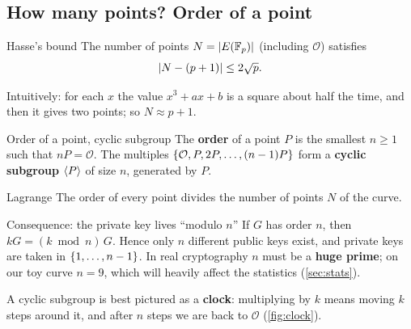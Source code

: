 \subsection{How many points? Order of a point}

\begin{framedthm}[label={thm:hasse}]{Hasse's bound}
  The number of points $N = \left\lvert E(\mathbb{F}_p)\right\rvert$ (including $\mathcal{O}$) satisfies
  \[
    \left\lvert N - (p+1)\right\rvert \le 2\sqrt{p}.
  \]
\end{framedthm}

Intuitively: for each $x$ the value $x^3 + ax + b$ is a square about half the time, and then it gives two points; so $N \approx p + 1$.

\begin{frameddefn}[label={def:order}]{Order of a point, cyclic subgroup}
  The \textbf{order} of a point $P$ is the smallest $n \ge 1$ such that $nP = \mathcal{O}$. The multiples $\left\{\mathcal{O}, P, 2P, \ldots, (n-1)P\right\}$ form a \textbf{cyclic subgroup} $\left\langle P \right\rangle$ of size $n$, generated by $P$.
\end{frameddefn}

\begin{framedthm}[label={thm:lagrange}]{Lagrange}
  The order of every point divides the number of points $N$ of the curve.
\end{framedthm}

\begin{framedobs}{Consequence: the private key lives ``modulo $n$''}
  If $G$ has order $n$, then $kG = (k \bmod n)\, G$. Hence only $n$ different public keys exist, and private keys are taken in $\left\{1, \ldots, n-1\right\}$. In real cryptography $n$ must be a \textbf{huge prime}; on our toy curve $n = 9$, which will heavily affect the statistics (\cref{sec:stats}).
\end{framedobs}

A cyclic subgroup is best pictured as a \textbf{clock}: multiplying by $k$ means moving $k$ steps around it, and after $n$ steps we are back to $\mathcal{O}$ (\cref{fig:clock}).

